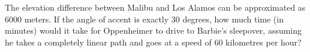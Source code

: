 The elevation difference between Malibu and Los Alamos can be approximated as $6000$ meters. If the angle of accent is exactly $30$ degrees, how much time (in minutes) would it take for Oppenheimer to drive to Barbie's sleepover, assuming he takes a completely linear path and goes at a speed of $60$ kilometres per hour?
